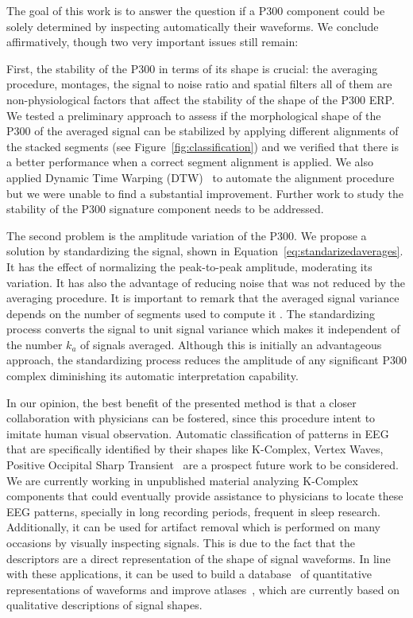 \documentclass[utf8]{frontiersSCNS} %
\begin{document}

The goal of this work is to answer the question if a P300 component could be solely determined by inspecting automatically their waveforms.  We conclude affirmatively, though two very important issues still remain:

First, the stability of the P300 in terms of its shape is crucial: the averaging procedure, montages, the signal to noise ratio and spatial filters all of them are non-physiological factors that affect the stability of the shape of the P300 ERP.  We tested a preliminary approach to assess if the morphological shape of the P300 of the averaged signal can be stabilized by applying different alignments of the stacked segments (see Figure~\ref{fig:classification}) and we verified that there is a better performance when a correct segment alignment is applied.  We also applied Dynamic Time Warping (DTW)~\citep{Casarotto2005} to automate the alignment procedure but we were unable to find a substantial improvement.  Further work to study the stability of the P300 signature component needs to be addressed.

The second problem is the amplitude variation of the P300. We propose a solution by standardizing the signal, shown in Equation~\ref{eq:standarizedaverages}. It has the effect of normalizing the peak-to-peak amplitude, moderating its variation. It has also the advantage of reducing noise that was not reduced by the averaging procedure.   It is important to remark that the averaged signal variance depends on the number of segments used to compute it \citep{van2006signal}.  The standardizing process converts the signal to unit signal variance which makes it independent of the number $k_a$ of signals averaged.   Although this is initially an advantageous approach, the standardizing process reduces the amplitude of any significant P300 complex diminishing its automatic interpretation capability.

In our opinion, the best benefit of the presented method is that a closer collaboration with physicians can be fostered, since this procedure intent to imitate human visual observation.  Automatic classification of patterns in EEG that are specifically identified by their shapes like K-Complex, Vertex Waves, Positive Occipital Sharp Transient~\citep{Hartman2005} are a prospect future work to be considered. We are currently working in unpublished material analyzing K-Complex components that could eventually provide  assistance to physicians to locate these EEG patterns, specially in long recording periods, frequent in sleep research.  
Additionally, it can be used for artifact removal which is performed on many occasions by visually inspecting signals.  This is due to the fact that the descriptors are a direct representation of the shape of signal waveforms. In line with these applications,  it can be used to build a database~\citep{Chavarriaga2017} of quantitative representations of waveforms and improve atlases~\citep{Hartman2005}, which are currently based on qualitative descriptions of signal shapes.
\end{document}
